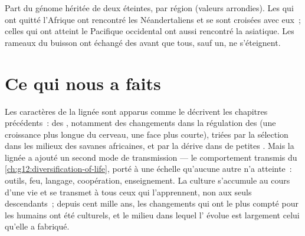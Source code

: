 \begin{omfigure}

{\small Part du génome héritée de deux  éteintes, par
région (valeurs arrondies). Les  qui ont quitté l'Afrique
ont rencontré les Néandertaliens et se sont croisées avec eux~; celles
qui ont atteint le Pacifique occidental ont aussi rencontré la
 asiatique. Les rameaux du buisson ont échangé des 
avant que tous, sauf un, ne s'éteignent.}
\end{omfigure}

\section{Ce qui nous a faits}

\begin{proposition}\label{prop:g12:human-evolution:culture}
Les caractères de la lignée sont apparus comme le décrivent les
chapitres précédents~: des , notamment des changements dans
la régulation des  (une croissance plus longue
du cerveau, une face plus courte), triées par la sélection dans les
milieux des savanes africaines, et par la dérive dans de petites
. Mais la lignée a ajouté un second mode de
transmission --- le comportement transmis du
\cref{ch:g12:diversification-of-life}, porté à une échelle qu'aucune
autre  n'a atteinte~: outils, feu, langage, coopération,
enseignement. La culture s'accumule au cours d'une vie et se transmet
à tous ceux qui l'apprennent, non aux seuls descendants~; depuis cent
mille ans, les changements qui ont le plus compté pour les humains ont
été culturels, et le milieu dans lequel l' évolue est largement
celui qu'elle a fabriqué.
\end{proposition}
\admitted

